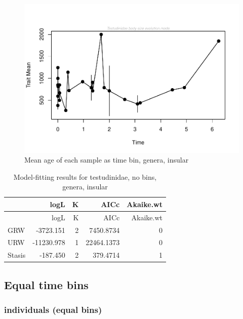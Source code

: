 \documentclass[]{article}
\begin{document}
\begin{figure}[htbp]
\centering
\includegraphics{MA_JJ_files/figure-latex/paleoTS with different time bins, no bins, genera, insular-1.pdf}
\caption{Mean age of each sample as time bin, genera, insular}
\end{figure}

\begin{longtable}[]{@{}lrrrr@{}}
\caption{Model-fitting results for testudinidae, no bins, genera,
insular}\tabularnewline
\toprule
& logL & K & AICc & Akaike.wt\tabularnewline
\midrule
\endfirsthead
\toprule
& logL & K & AICc & Akaike.wt\tabularnewline
\midrule
\endhead
GRW & -3723.151 & 2 & 7450.8734 & 0\tabularnewline
URW & -11230.978 & 1 & 22464.1373 & 0\tabularnewline
Stasis & -187.450 & 2 & 379.4714 & 1\tabularnewline
\bottomrule
\end{longtable}

\newpage

\subsection{Equal time bins}\label{equal-time-bins}

\subsubsection{individuals (equal bins)}\label{individuals-equal-bins}
\end{document}
